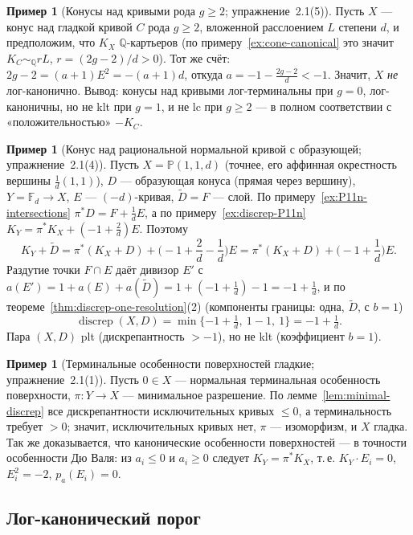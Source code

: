 \documentclass[11pt,a4paper]{article}
\theoremstyle{plain}
\theoremstyle{definition}
\newtheorem{example}[theorem]{Пример}
\theoremstyle{remark}
\newcommand{\Q}{\mathbb{Q}}
\newcommand{\PP}{\mathbb{P}}
\DeclareMathOperator{\discrep}{discrep}
\begin{document}
\begin{example}[Конусы над кривыми рода $g\ge2$; упражнение~2.1(5)]
Пусть $X$ --- конус над гладкой кривой $C$ рода $g\ge2$, вложенной расслоением $L$ степени $d$,
и предположим, что $K_X$ $\Q$-картьеров (по примеру~\ref{ex:cone-canonical} это значит
$K_C\sim_\Q rL$, $r=(2g-2)/d>0$). Тот же счёт: $2g-2=(a+1)E^2=-(a+1)d$, откуда
$a=-1-\frac{2g-2}d<-1$. Значит, $X$ \emph{не} лог-канонично. Вывод: конусы над кривыми
лог-терминальны при $g=0$, лог-каноничны, но не klt при $g=1$, и не lc при $g\ge2$ --- в полном
соответствии с «положительностью» $-K_C$.
\end{example}

\begin{example}[Конус над рациональной нормальной кривой с образующей; упражнение~2.1(4)]
Пусть $X=\PP(1,1,d)$ (точнее, его аффинная окрестность вершины $\frac1d(1,1)$), $D$ ---
образующая конуса (прямая через вершину), $Y=\mathbb F_d\to X$, $E$ --- $(-d)$-кривая,
$\tilde D=F$ --- слой. По примеру~\ref{ex:P11n-intersections} $\pi^*D=F+\frac1dE$, а по
примеру~\ref{ex:discrep-P11n} $K_Y=\pi^*K_X+(-1+\frac2d)E$. Поэтому
\[
K_Y+\tilde D=\pi^*(K_X+D)+\Big(-1+\frac2d-\frac1d\Big)E=\pi^*(K_X+D)+\Big(-1+\frac1d\Big)E .
\]
Раздутие точки $F\cap E$ даёт дивизор $E'$ с $a(E')=1+a(E)+a(\tilde D)=1+(-1+\frac1d)-1=-1+\frac1d$,
и по теореме~\ref{thm:discrep-one-resolution}(2) (компоненты границы: одна, $\tilde D$, с $b=1$)
\[
\discrep(X,D)=\min\{-1+\tfrac1d,\ 1-1,\ 1\}=-1+\tfrac1d .
\]
Пара $(X,D)$ plt (дискрепантность $>-1$), но не klt (коэффициент $b=1$).
\end{example}

\begin{example}[Терминальные особенности поверхностей гладкие; упражнение~2.1(1)]\label{ex:terminal-smooth}
Пусть $0\in X$ --- нормальная терминальная особенность поверхности, $\pi\colon Y\to X$ ---
минимальное разрешение. По лемме~\ref{lem:minimal-discrep} все дискрепантности исключительных
кривых $\le0$, а терминальность требует $>0$; значит, исключительных кривых нет, $\pi$ ---
изоморфизм, и $X$ гладка. Так же доказывается, что канонические особенности поверхностей ---
в точности особенности Дю Валя: из $a_i\le0$ и $a_i\ge0$ следует $K_Y=\pi^*K_X$, т.\,е. $K_Y\cdot E_i=0$,
$E_i^2=-2$, $p_a(E_i)=0$.
\end{example}

\subsection{Лог-канонический порог}
\end{document}
